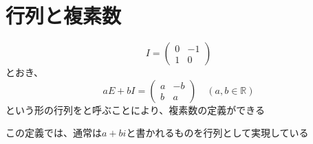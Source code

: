 \documentclass[../../../topic_linear-algebra]{subfiles}
\begin{document}
\sectionline
\section{行列と複素数}

\begin{equation*}
  I = \begin{pmatrix}
    0 & -1 \\
    1 & 0
  \end{pmatrix}
\end{equation*}
とおき、
\begin{equation*}
  aE + bI = \begin{pmatrix}
    a & -b \\
    b & a
  \end{pmatrix} \quad (a, b \in \mathbb{R})
\end{equation*}
という形の行列をと呼ぶことにより、複素数の定義ができる

この定義では、通常は$a + bi$と書かれるものを行列として実現している

\br

\end{document}
